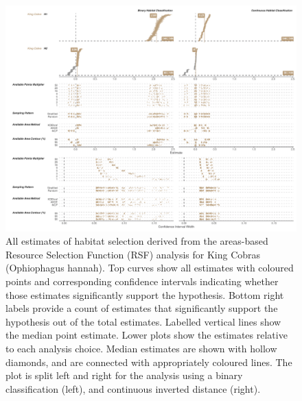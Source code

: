 \documentclass[10pt,a4paper]{article}
\begin{document}
\begin{figure}[h]
\includegraphics[width=1\linewidth]{../../figures/specCurve_King Cobra_rsf} \caption{All estimates of habitat selection derived from the areas-based Resource Selection Function (RSF) analysis for King Cobras (Ophiophagus hannah). Top curves show all estimates with coloured points and corresponding confidence intervals indicating whether those estimates significantly support the hypothesis. Bottom right labels provide a count of estimates that significantly support the hypothesis out of the total estimates. Labelled vertical lines show the median point estimate. Lower plots show the estimates relative to each analysis choice. Median estimates are shown with hollow diamonds, and are connected with appropriately coloured lines. The plot is split left and right for the analysis using a binary classification (left), and continuous inverted distance (right).}\label{fig:specCurveRsfOPHA}
\end{figure}
\end{document}
